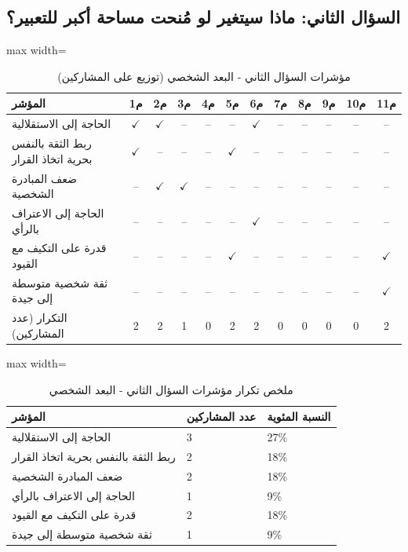 \documentclass[12pt,oneside]{report}
\begin{document}
\subsection{السؤال الثاني: ماذا سيتغير لو مُنحت مساحة أكبر للتعبير؟}
\begin{table}[H]
\centering
\caption{مؤشرات السؤال الثاني - البعد الشخصي (توزيع على المشاركين)}
\scriptsize
\renewcommand{\arraystretch}{1.3}
\setlength{\tabcolsep}{4pt}
\begin{adjustbox}{max width=\textwidth}
\begin{tabular}{l c c c c c c c c c c c}
\toprule
\textbf{المؤشر} & \textbf{م1} & \textbf{م2} & \textbf{م3} & \textbf{م4} & \textbf{م5} & \textbf{م6} & \textbf{م7} & \textbf{م8} & \textbf{م9} & \textbf{م10} & \textbf{م11} \\
\midrule
الحاجة إلى الاستقلالية & $\checkmark$ & $\checkmark$ & -- & -- & -- & $\checkmark$ & -- & -- & -- & -- & -- \\
ربط الثقة بالنفس بحرية اتخاذ القرار & $\checkmark$ & -- & -- & -- & $\checkmark$ & -- & -- & -- & -- & -- & -- \\
ضعف المبادرة الشخصية & -- & $\checkmark$ & $\checkmark$ & -- & -- & -- & -- & -- & -- & -- & -- \\
الحاجة إلى الاعتراف بالرأي & -- & -- & -- & -- & -- & $\checkmark$ & -- & -- & -- & -- & -- \\
قدرة على التكيف مع القيود & -- & -- & -- & -- & $\checkmark$ & -- & -- & -- & -- & -- & $\checkmark$ \\
ثقة شخصية متوسطة إلى جيدة & -- & -- & -- & -- & -- & -- & -- & -- & -- & -- & $\checkmark$ \\
التكرار (عدد المشاركين) & 2 & 2 & 1 & 0 & 2 & 2 & 0 & 0 & 0 & 0 & 2 \\
\bottomrule
\end{tabular}
\end{adjustbox}
\end{table}
\begin{table}[H]
\centering
\caption{ملخص تكرار مؤشرات السؤال الثاني - البعد الشخصي}
\small
\renewcommand{\arraystretch}{1.3}
\setlength{\tabcolsep}{4pt}
\begin{adjustbox}{max width=\textwidth}
\begin{tabular}{p{6cm} p{4cm} p{4cm}}
\toprule
\textbf{المؤشر} & \textbf{عدد المشاركين} & \textbf{النسبة المئوية} \\
\midrule
الحاجة إلى الاستقلالية & 3 & 27\% \\
ربط الثقة بالنفس بحرية اتخاذ القرار & 2 & 18\% \\
ضعف المبادرة الشخصية & 2 & 18\% \\
الحاجة إلى الاعتراف بالرأي & 1 & 9\% \\
قدرة على التكيف مع القيود & 2 & 18\% \\
ثقة شخصية متوسطة إلى جيدة & 1 & 9\% \\
\bottomrule
\end{tabular}
\end{adjustbox}
\end{table}
\end{document}
